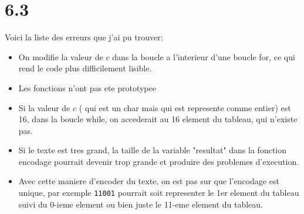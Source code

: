 \documentclass[11pt, a4paper, twoside]{article}
\begin{document}
\section*{6.3}
Voici la liste des erreurs que j'ai pu trouver:
\begin{itemize}
\item On modifie la valeur de $c$ dans la boucle a l'interieur d'une  boucle for, ce qui rend le code plus difficilement lisible.
\item Les fonctions n'ont pas ete prototypee
\item Si la valeur de $c$ ( qui est un char mais qui est represente comme entier) est 16, dans la boucle while, on accederait au 16 element du tableau, qui n'existe pas.
\item Si le texte est tres grand, la taille de la variable "resultat" dans la fonction encodage pourrait devenir trop grande et produire des problemes d'execution.
\item Avec cette maniere d'encoder du texte, on est pas sur que l'encodage est unique, par exemple \texttt{11001} pourrait soit representer le 1er element du tableau suivi du 0-ieme element ou bien juste le 11-eme element du tableau.
\end{itemize}
	
\end{document}
